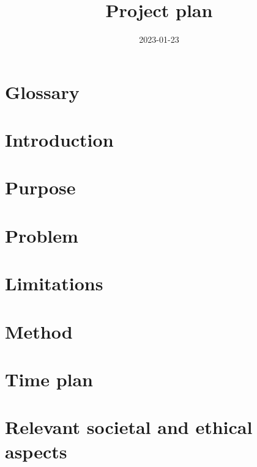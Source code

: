 \documentclass[titlepage]{article}
\title{%
    \Huge Project plan
}
\date{2023-01-23}
\begin{document}
\maketitle
\newpage

\tableofcontents
\thispagestyle{plain}
\newpage

\section*{Glossary}
    
\thispagestyle{plain}
\newpage

\section{Introduction}
    

\section{Purpose} \label{Purpose}
    

\section{Problem}
    

\section{Limitations}
    

\section{Method}
    

\section{Time plan}\label{time-plan}
    

\section{Relevant societal and ethical aspects}
    

\end{document}
